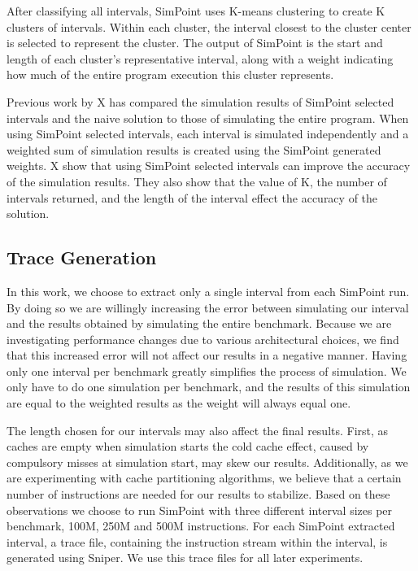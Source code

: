 After classifying all intervals, SimPoint uses K-means clustering to create K clusters of intervals. 
Within each cluster, the interval closest to the cluster center is selected to represent the cluster. 
The output of SimPoint is the start and length of each cluster's representative interval, along with a weight indicating how much of the entire program execution this cluster represents.

Previous work by X has compared the simulation results of SimPoint selected intervals and the naive solution to those of simulating the entire program. 
When using SimPoint selected intervals, each interval is simulated independently and a weighted sum of simulation results is created using the SimPoint generated weights.
X show that using SimPoint selected intervals can improve the accuracy of the simulation results. They also show that the value of K, the number of intervals returned, and the length of the interval effect the accuracy of the solution.

\subsection{Trace Generation} 
In this work, we choose to extract only a single interval from each SimPoint run.
By doing so we are willingly increasing the error between simulating our interval and the results obtained by simulating the entire benchmark.
Because we are investigating performance changes due to various architectural choices, we find that this increased error will not affect our results in a negative manner.
Having only one interval per benchmark greatly simplifies the process of simulation.
We only have to do one simulation per benchmark, and the results of this simulation are equal to the weighted results as the weight will always equal one.

The length chosen for our intervals may also affect the final results.
First, as caches are empty when simulation starts the cold cache effect, caused by compulsory misses at simulation start, may skew our results.
Additionally, as we are experimenting with cache partitioning algorithms, we believe that a certain number of instructions are needed for our results to stabilize.
Based on these observations we choose to run SimPoint with three different interval sizes per benchmark, 100M, 250M and 500M instructions.
For each SimPoint extracted interval, a trace file, containing the instruction stream within the interval, is generated using Sniper.
We use this trace files for all later experiments.

